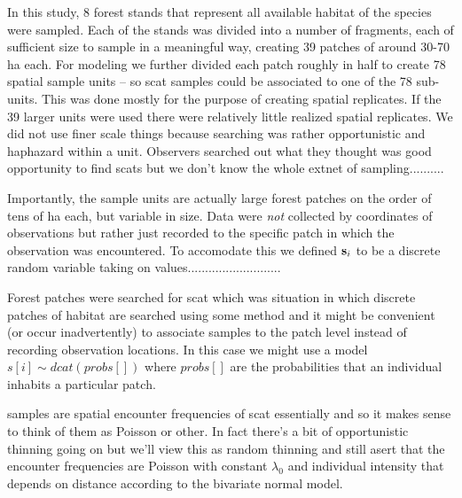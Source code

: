 In this study,
8 forest stands  that represent all available habitat of the
species were sampled. Each of the stands was divided into a number of
fragments, each of
sufficient size to sample in a meaningful way, creating 39 patches of around
30-70 ha each. For modeling we further divided each patch roughly in half to
create 78 spatial sample units -- so scat samples could be associated to one of
the 78 sub-units. This was done mostly for the purpose of creating spatial
replicates. If the 39 larger units were used there were relatively little
realized spatial replicates.
We did not use finer scale things because searching was rather opportunistic
and haphazard within a unit. Observers searched out what they thought was
good opportunity to find scats but we don't know the whole extnet of
sampling..........

Importantly, the sample units are actually large forest
patches on the order of tens of ha each, but variable in size. Data
were {\it not} collected by coordinates of observations but rather
just recorded to the specific patch in which the observation was
encountered. To accomodate this we defined ${\bf s}_{i}$ to be a
discrete
random variable taking on values...........................

Forest patches were searched for scat which was
situation in which discrete patches of habitat are searched using some
method and it might be convenient (or occur inadvertently) to
associate samples to the patch level instead of recording observation
locations. In this case we might use a model $s[i] \sim dcat(probs[])$
where $probs[]$ are the probabilities that an individual inhabits a
particular patch.

samples are spatial encounter frequencies of scat essentially and so
it makes sense to think of them as Poisson or other.
In fact there's a bit of opportunistic thinning going on but we'll view
this as random thinning and still asert that the encounter frequencies
are Poisson with constant $\lambda_{0}$ and individual intensity that
depends on distance according to the bivariate normal model.



